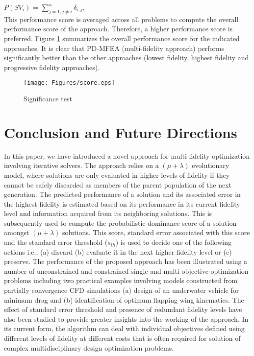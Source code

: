 $P(SV_i)$ = $\sum_{j = 1,j\neq i}^n \delta_{i,j}$.\\

This performance score is averaged across all problems to compute the overall performance score of the approach. Therefore, a higher performance score is preferred. Figure \ref{fig:score} summarizes the overall performance score for the indicated approaches. It is clear that PD-MFEA (multi-fidelity approach) performs significantly better than the other approaches (lowest fidelity, highest fidelity and progressive fidelity approaches).

\begin{figure}[ht]
	\centering
	\texttt{[image: Figures/score.eps]}
	\caption{Significance test}
	\label{fig:score}
\end{figure}

\section{Conclusion and Future Directions}
In this paper, we have introduced a novel approach for multi-fidelity optimization involving iterative solvers. The approach relies on a $(\mu+\lambda)$ evolutionary model, where solutions are only evaluated in higher levels of fidelity if they cannot be safely discarded as members of the parent population of the next generation. The predicted performance of a solution and its associated error in the highest fidelity is estimated based on its performance in its current fidelity level and information acquired from its neighboring solutions. This is subsequently used to compute the probabilistic dominance score of a solution amongst $(\mu+\lambda)$ solutions. This score, standard error associated with this score and the standard error threshold ($s_{th}$) is used to decide one of the following actions i.e., (a) discard (b) evaluate it in the next higher fidelity level or (c) preserve. The performance of the proposed approach has been illustrated using a number of unconstrained and constrained single and multi-objective optimization problems including two practical examples involving models constructed from partially convergence CFD simulations (a) design of an underwater vehicle for minimum drag and (b) identification of optimum flapping wing kinematics. The effect of standard error threshold and presence of redundant fidelity levels have also been studied to provide greater insights into the working of the approach. In its current form, the algorithm can deal with individual objectives defined using different levels of fidelity at different costs that is often required for solution of complex multidisciplinary design optimization problems. 

